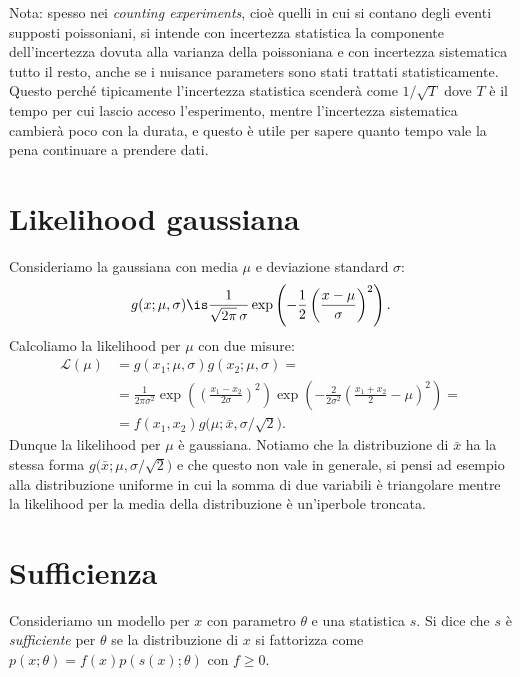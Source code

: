 Nota: spesso nei \emph{counting experiments},
cioè quelli in cui si contano degli eventi supposti poissoniani,
si intende con incertezza statistica la componente dell'incertezza dovuta alla varianza della poissoniana
e con incertezza sistematica tutto il resto,
anche se i nuisance parameters sono stati trattati statisticamente.
Questo perché tipicamente l'incertezza statistica scenderà come $1/\sqrt T$
dove $T$ è il tempo per cui lascio acceso l'esperimento,
mentre l'incertezza sistematica cambierà poco con la durata,
e questo è utile per sapere quanto tempo vale la pena continuare a prendere dati.

\section{Likelihood gaussiana}

Consideriamo la gaussiana con media $\mu$ e deviazione standard $\sigma$:
\begin{equation*}
	g(x;\mu,\sigma) \is \frac1{\sqrt{2\pi}\,\sigma}
    \exp\left(-\frac12 \left( \frac{x-\mu}\sigma \right)^2\right).
\end{equation*}
Calcoliamo la likelihood per $\mu$ con due misure:
\begin{align*}
	\mathcal L(\mu)
	&= g(x_1;\mu,\sigma) g(x_2;\mu,\sigma) = \\
	&= \frac1{2\pi\sigma^2}
	\exp\left(\left( \frac{x_1-x_2}{2\sigma} \right)^2\right)
	\exp\left(-\frac2{2\sigma^2} \left( \frac{x_1+x_2}2 - \mu \right)^2\right) = \\
	&= f(x_1,x_2) g \big( \mu;\bar x,\sigma/\sqrt2 \big).
\end{align*}
Dunque la likelihood per $\mu$ è gaussiana.
Notiamo che la distribuzione di $\bar x$ ha la stessa forma $g \big( \bar x;\mu,\sigma/\sqrt2 \big)$
e che questo non vale in generale, si pensi ad esempio alla distribuzione uniforme
in cui la somma di due variabili è triangolare mentre la likelihood per la media della distribuzione è un'iperbole troncata.

\section{Sufficienza}

\begin{definition}[Sufficienza]
	\label{th:suff}
	Consideriamo un modello per $x$ con parametro $\theta$ e una statistica $s$.
	Si dice che $s$ è \emph{sufficiente} per $\theta$ se la distribuzione di $x$ si fattorizza come
	$p(x;\theta) = f(x) p(s(x);\theta)$ con $f\ge0$.
\end{definition}

